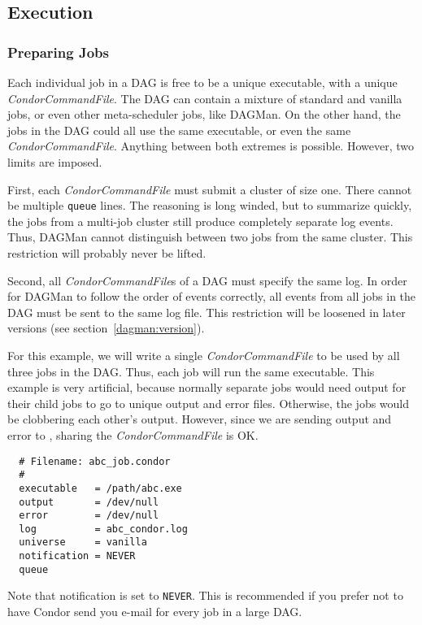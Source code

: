\subsection{Execution}

\subsubsection{Preparing Jobs}

Each individual job in a DAG is free to be a unique executable, with a unique
\textit{CondorCommandFile}.  The DAG can contain a mixture of standard and
vanilla jobs, or even other meta-scheduler jobs, like DAGMan.  On the other
hand, the jobs in the DAG could all use the same executable, or even the same
\textit{CondorCommandFile}.  Anything between both extremes is possible.
However, two limits are imposed.

First, each \textit{CondorCommandFile} must submit a cluster of size one.
There cannot be multiple \texttt{queue} lines.  The reasoning is long winded,
but to summarize quickly, the jobs from a multi-job cluster still produce
completely separate log events.  Thus, DAGMan cannot distinguish between two
jobs from the same cluster.  This restriction will probably never be lifted.

Second, all \textit{CondorCommandFile}s of a DAG must specify the same log.
In order for DAGMan to follow the order of events correctly, all events from
all jobs in the DAG must be sent to the same log file.  This restriction will
be loosened in later versions (see section~\ref{dagman:version}).

For this example, we will write a single \textit{CondorCommandFile} to be used
by all three jobs in the DAG.  Thus, each job will run the same executable.
This example is very artificial, because normally separate jobs would need
output for their child jobs to go to unique output and error files.
Otherwise, the jobs would be clobbering each other's output.  However, since
we are sending output and error to , sharing the
\textit{CondorCommandFile} is OK.

\begin{verbatim}
  # Filename: abc_job.condor
  #
  executable   = /path/abc.exe
  output       = /dev/null
  error        = /dev/null
  log          = abc_condor.log
  universe     = vanilla
  notification = NEVER
  queue
\end{verbatim}

Note that notification is set to \texttt{NEVER}.  This is recommended if you
prefer not to have Condor send you e-mail for every job in a large DAG.

